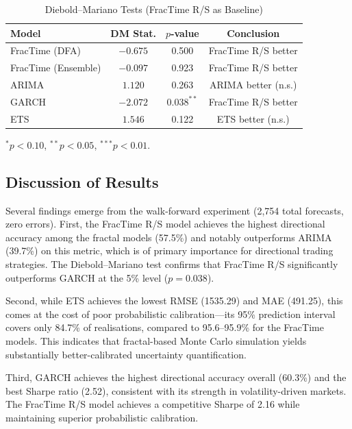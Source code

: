 \documentclass[12pt,a4paper]{article}
\begin{document}
\begin{table}[htbp]
  \centering
  \caption{Diebold--Mariano Tests (FracTime R/S as Baseline)}
  \label{tab:dm_tests}
  \begin{threeparttable}
  \begin{tabular}{lccc}
    \toprule
    \textbf{Model} & \textbf{DM Stat.} & \textbf{$p$-value} & \textbf{Conclusion} \\
    \midrule
    FracTime (DFA)      & $-0.675$ & 0.500 & FracTime R/S better \\
    FracTime (Ensemble) & $-0.097$ & 0.923 & FracTime R/S better \\
    ARIMA               & $1.120$  & 0.263 & ARIMA better (n.s.) \\
    GARCH               & $-2.072$ & $0.038^{**}$ & FracTime R/S better \\
    ETS                 & $1.546$  & 0.122 & ETS better (n.s.) \\
    \bottomrule
  \end{tabular}
  \begin{tablenotes}\small
    \item ${}^*p<0.10$, ${}^{**}p<0.05$, ${}^{***}p<0.01$.
  \end{tablenotes}
  \end{threeparttable}
\end{table}

\subsection{Discussion of Results}

Several findings emerge from the walk-forward experiment (2,754 total forecasts,
zero errors).  First, the FracTime R/S model achieves the highest directional
accuracy among the fractal models (57.5\%) and notably outperforms ARIMA (39.7\%)
on this metric, which is of primary importance for directional trading strategies.
The Diebold--Mariano test confirms that FracTime R/S significantly outperforms
GARCH at the 5\% level ($p = 0.038$).

Second, while ETS achieves the lowest RMSE (1535.29) and MAE (491.25), this comes
at the cost of poor probabilistic calibration---its 95\% prediction interval
covers only 84.7\% of realisations, compared to 95.6--95.9\% for the FracTime
models.  This indicates that fractal-based Monte Carlo simulation yields
substantially better-calibrated uncertainty quantification.

Third, GARCH achieves the highest directional accuracy overall (60.3\%) and the
best Sharpe ratio (2.52), consistent with its strength in volatility-driven
markets.  The FracTime R/S model achieves a competitive Sharpe of 2.16 while
maintaining superior probabilistic calibration.
\end{document}

